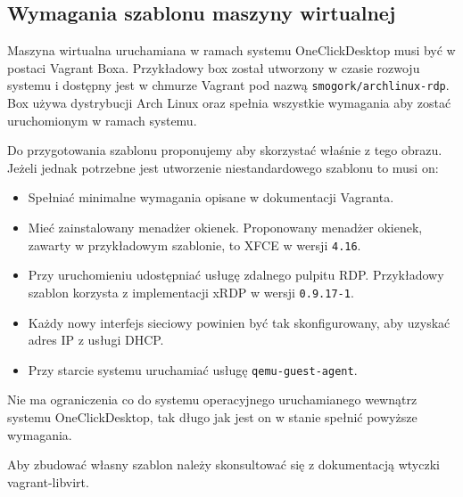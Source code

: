 \documentclass[../opis-rozwiazania.tex]{subfiles}
\begin{document}
\subsection{Wymagania szablonu maszyny wirtualnej}
\label{system_requirements.vagrant_box}
Maszyna wirtualna uruchamiana w ramach systemu OneClickDesktop musi być w postaci Vagrant Boxa.
Przykładowy box został utworzony w czasie rozwoju systemu i dostępny jest w chmurze Vagrant pod nazwą \texttt{smogork/archlinux-rdp}\parencite{ocd-vbox}.
Box używa dystrybucji Arch Linux oraz spełnia wszystkie wymagania aby zostać uruchomionym w ramach systemu.

Do przygotowania szablonu proponujemy aby skorzystać właśnie z tego obrazu.
Jeżeli jednak potrzebne jest utworzenie niestandardowego szablonu to musi on:
\begin{itemize}
	\item Spełniać minimalne wymagania opisane w dokumentacji Vagranta\parencite{vagrant-basebox}.
	\item Mieć zainstalowany menadżer okienek. Proponowany menadżer okienek, zawarty w przykładowym szablonie, to XFCE w wersji \texttt{4.16}.
	\item Przy uruchomieniu udostępniać usługę zdalnego pulpitu RDP. Przykładowy szablon korzysta z implementacji xRDP w wersji \texttt{0.9.17-1}.
	\item Każdy nowy interfejs sieciowy powinien być tak skonfigurowany, aby uzyskać adres IP z usługi DHCP.
	\item Przy starcie systemu uruchamiać usługę \texttt{qemu-guest-agent}.
\end{itemize}
Nie ma ograniczenia co do systemu operacyjnego uruchamianego wewnątrz systemu OneClickDesktop, tak długo jak jest on w stanie spełnić powyższe wymagania.

Aby zbudować własny szablon należy skonsultować się z dokumentacją wtyczki vagrant-libvirt\parencite{vlibvirt-box}.
\end{document}
